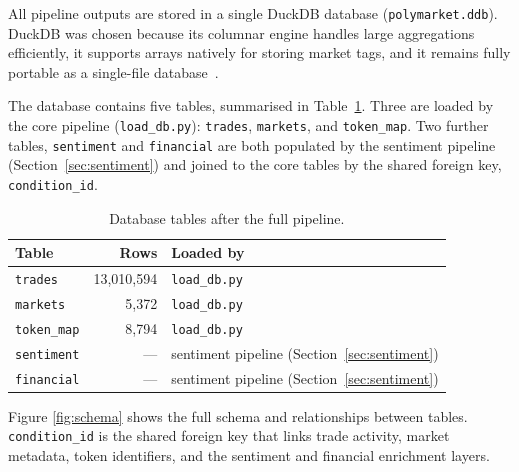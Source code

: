 \documentclass[11pt,a4paper]{article}
\begin{document}
All pipeline outputs are stored in a single DuckDB database (\texttt{polymarket.ddb}). 
DuckDB was chosen because its columnar engine handles large aggregations efficiently, 
it supports arrays natively for storing market tags, and it remains fully portable as a
 single-file database~\cite{duckdb}.

\noindent The database contains five tables, summarised in
Table~\ref{tab:rowcounts}.  Three are loaded by the core pipeline
(\texttt{load\_db.py}): \texttt{trades}, \texttt{markets}, and
\texttt{token\_map}.  Two further tables, \texttt{sentiment} and
\texttt{financial} are both populated by the sentiment pipeline
(Section~\ref{sec:sentiment}) and joined to the core tables by the shared foreign key,
\texttt{condition\_id}.

\begin{table}[H]
\centering
\caption{Database tables after the full pipeline.}
\label{tab:rowcounts}
\small
\begin{tabularx}{\textwidth}{l r X}
\toprule
\textbf{Table} & \textbf{Rows} & \textbf{Loaded by} \\
\midrule
\texttt{trades}     & 13{,}010{,}594 & \texttt{load\_db.py} \\
\texttt{markets}    &      5{,}372   & \texttt{load\_db.py} \\
\texttt{token\_map} &      8{,}794   & \texttt{load\_db.py} \\
\texttt{sentiment}  &        ---     & sentiment pipeline
                                       (Section~\ref{sec:sentiment}) \\
\texttt{financial}  &        ---     & sentiment pipeline
                                       (Section~\ref{sec:sentiment}) \\
\bottomrule
\end{tabularx}
\end{table}

\noindent Figure \ref{fig:schema} shows the full schema and
relationships between tables.  \texttt{condition\_id} is the shared
foreign key that links trade activity, market metadata, token
identifiers, and the sentiment and financial enrichment layers.
\end{document}
